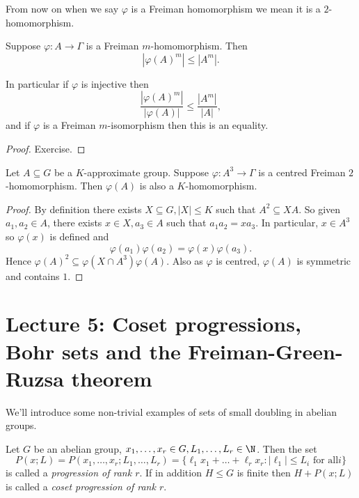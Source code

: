 \documentclass[a4paper]{article}
\begin{document}
From now on when we say \(\varphi\) is a Freiman homomorphism we mean it is a \(2\)-homomorphism.

\begin{lemma}[lemma 4.7]
  Suppose \(\varphi: A \to \Gamma\) is a Freiman \(m\)-homomorphism. Then
  \[
    |\varphi(A)^m| \leq |A^m|.
  \]

  In particular if \(\varphi\) is injective then
  \[
    \frac{|\varphi(A)^m|}{|\varphi(A)|} \leq \frac{|A^m|}{|A|},
  \]
  and if \(\varphi\) is a Freiman \(m\)-isomorphism then this is an equality.
\end{lemma}

\begin{proof}
  Exercise.
\end{proof}

\begin{lemma}[lemma 4.8]
  Let \(A \subseteq G\) be a \(K\)-approximate group. Suppose \(\varphi: A^3 \to \Gamma\) is a centred Freiman \(2\)-homomorphism. Then \(\varphi(A)\) is also a \(K\)-homomorphism.
\end{lemma}

\begin{proof}
  By definition there exists \(X \subseteq G, |X| \leq K\) such that \(A^2 \subseteq XA\). So given \(a_1, a_2 \in A\), there exists \(x \in X, a_3 \in A\) such that \(a_1a_2 = xa_3\). In particular, \(x \in A^3\) so \(\varphi(x)\) is defined and
  \[
    \varphi(a_1) \varphi(a_2) = \varphi(x) \varphi(a_3).
  \]
  Hence \(\varphi(A)^2 \subseteq \varphi(X \cap A^3) \varphi(A)\). Also as \(\varphi\) is centred, \(\varphi(A)\) is symmetric and contains \(1\).
\end{proof}

\section*{Lecture 5: Coset progressions, Bohr sets and the Freiman-Green-Ruzsa theorem}

We'll introduce some non-trivial examples of sets of small doubling in abelian groups.

\begin{definition}
  Let \(G\) be an abelian group, \(x_1, \dots, x_r \in G, L_1, \dots, L_r \in \N\). Then the set
  \[
    P(x; L) = P(x_1, \dots, x_r; L_1, \dots, L_r) = \{\ell_1x_1 + \dots + \ell_rx_r: |\ell_1| \leq L_i \text{ for all} i\}
  \]
  is called a \emph{progression of rank \(r\)}. If in addition \(H \leq G\) is finite then \(H + P(x; L)\) is called a \emph{coset progression of rank \(r\)}.
\end{definition}
\end{document}
